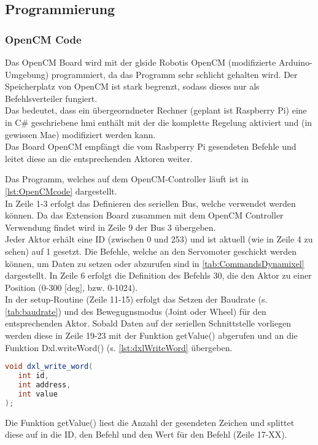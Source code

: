 \subsection{Programmierung}
\subsubsection{OpenCM Code}
Das OpenCM Board wird mit der gls{ide} Robotis OpenCM (modifizierte 
Arduino-Umgebung) programmiert, da das Programm sehr schlicht gehalten wird.
Der Speicherplatz von OpenCM ist stark begrenzt, sodass dieses nur als 
Befehlsverteiler fungiert.\\
Das bedeutet, dass ein übergeorndneter Rechner (geplant ist Raspberry Pi) eine 
in C\# geschriebene \gls{hmi} enthält mit der die komplette Regelung aktiviert 
und (in gewissen Mae) modifiziert werden kann.\\
Das Board OpenCM empfängt die vom Rasbperry Pi gesendeten Befehle und leitet 
diese an die entsprechenden Aktoren weiter.

Das Programm, welches auf dem OpenCM-Controller läuft ist in 
\ref{lst:OpenCMcode} dargestellt.\\
In Zeile 1-3 erfolgt das Definieren des seriellen Bus, welche verwendet werden 
können. Da das Extension Board zusammen mit dem OpenCM Controller Verwendung 
findet wird in Zeile 9 der Bus 3 übergeben.\\
Jeder Aktor erhält eine ID (zwischen 0 und 253) und ist aktuell (wie in Zeile 4 
zu sehen) auf 1 gesetzt. 
Die Befehle, welche an den Servomoter geschickt werden können, um Daten zu 
setzen oder abzurufen sind in \ref{tab:CommandsDynamixel} dargestellt. In Zeile 
6 erfolgt die Definition des Befehls 30, die den Aktor zu einer Position (0-300 
$[$deg$]$, bzw. 0-1024).\\
In der setup-Routine (Zeile 11-15) erfolgt das Setzen der Baudrate (s. 
\ref{tab:baudrate}) und des Bewegugnsmodus (Joint oder Wheel) für den 
entsprechenden Aktor. 
Sobald Daten auf der seriellen Schnittstelle vorliegen werden diese in Zeile 
19-23 mit der Funktion getValue() abgerufen und an die Funktion Dxl.writeWord() 
(s. \ref{lst:dxlWriteWord} übergeben.
\label{lst:dxlWriteWord}
\begin{lstlisting}[language=java, caption=Funktion dxlWriteWord]
void dxl_write_word(
   int id,
   int address,
   int value
);
\end{lstlisting}

Die Funktion getValue() liest die Anzahl der gesendeten Zeichen und splittet 
diese auf in die ID, den Befehl und den Wert für den Befehl (Zeile 17-XX).

